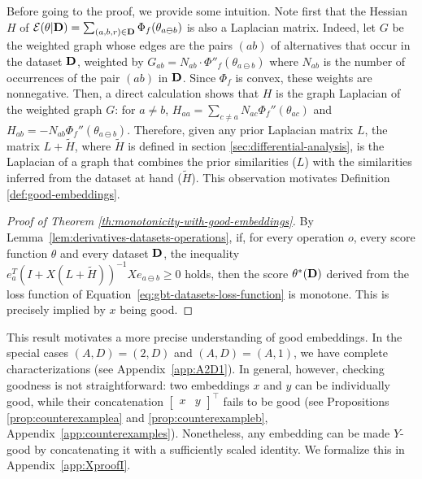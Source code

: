 \documentclass{article}
\newcommand{\cE}{\mathcal E}
\newcommand{\bD}{{\bf D}}
\newcommand{\ab}{a\ominus{} b}
\begin{document}
Before going to the proof, we provide some intuition.
Note first that the Hessian $H$ of
$\cE(\theta | \bD) = \sum_{(a,b,r) \in \bD} \Phi_f(\theta_{\ab})$
is also a Laplacian matrix.
    Indeed, let $G$ be the weighted graph whose edges
    are the pairs $(ab)$ of alternatives that occur in the dataset $\bD$,
    weighted by
    $G_{ab} = N_{ab} \cdot \Phi''_f(\theta_{\ab})$
    where $N_{ab}$
    is the number of occurrences of the pair $(ab)$ in $\bD$.
    Since $\Phi_f$ is convex, these weights are nonnegative.
    Then, a direct calculation shows that $H$
    is the graph Laplacian of the weighted graph $G$:
    for $a \neq b$,
        $H_{aa} = \sum_{c \neq a} N_{ac} \Phi_f''(\theta_{ac})$ and
        $H_{ab} = - N_{ab} \Phi_f''(\theta_{\ab})$.
Therefore, given any prior Laplacian matrix $L$, the matrix $L + \tilde{H}$, where $\tilde{H}$ is defined in section \ref{sec:differential-analysis}, is the Laplacian of a graph that combines the prior similarities ($L$) with the similarities inferred from the dataset at hand ($\tilde{H}$).
This observation motivates Definition \ref{def:good-embeddings}.


\begin{proof}[Proof of Theorem \ref{th:monotonicity-with-good-embeddings}]
    By Lemma~\ref{lem:derivatives-datasets-operations}, 
    if, for every operation $o$, 
    every score function $\theta$ 
    and every dataset $\bD$,
    the inequality $e_a^T (I + X(L+\tilde{H}))^{-1}X e_{\ab{}} \ge 0$ holds,
    then the score $\theta^*(\bD)$ derived from 
    the loss function of Equation~\eqref{eq:gbt-datasets-loss-function}
    is monotone.
    This is precisely implied by $x$ being good.
\end{proof}

This result motivates a more precise understanding of good embeddings. 
In the special cases $(A, D) = (2, D)$ and $(A, D) = (A, 1)$, 
we have complete characterizations (see Appendix~\ref{app:A2D1}). 
In general, however, checking goodness is not straightforward: two embeddings $x$ and $y$ can be individually good, while their concatenation $\begin{bmatrix} x & y \end{bmatrix}^\top$ fails to be good (see Propositions \ref{prop:counterexamplea} and \ref{prop:counterexampleb}, Appendix~\ref{app:counterexamples}). 
Nonetheless, any embedding can be made $Y$-good by concatenating it with a sufficiently scaled identity. We formalize this in Appendix~\ref{app:XproofI}.
\end{document}
